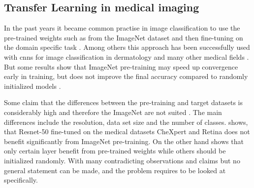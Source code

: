 \subsection{Transfer Learning in medical imaging}
In the past years it became common practise in image classification to use the pre-trained weights such as from the ImageNet dataset and then fine-tuning on the domain specific task \autocite{russakovsky2014}. 
Among others this approach has been successfully used with \glspl{cnn} for image classification in dermatology and many other medical fields \autocite{esteva2017,lam2018,bayramoglu2016,pardamean2018,yang2018}. But some results show that ImageNet pre-training may speed up convergence early in training, but does not improve the final accuracy compared to randomly initialized models \autocite{he2018}.

Some claim that the differences between the pre-training and target datasets is considerably high and therefore the ImageNet are not suited \autocite{raghu2019}.
The main differences include the resolution, data set size and the number of classes.
\autocite{raghu2019} shows, that Resnet-50 fine-tuned on the medical datasets CheXpert and Retina does not benefit significantly from ImageNet pre-training. On the other hand \autocite{raghu2019} shows that only certain layer benefit from pre-trained weights while others should be initialized randomly. With many contradicting observations and claims but no general statement can be made, and the problem requires to be looked at specifically.






